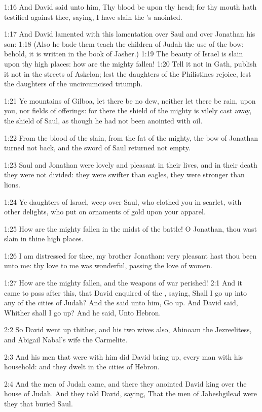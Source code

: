 1:16 And David said unto him, Thy blood be upon thy head; for thy
mouth hath testified against thee, saying, I have slain the \LORD's
anointed.

1:17 And David lamented with this lamentation over Saul and over
Jonathan his son: 1:18 (Also he bade them teach the children of Judah
the use of the bow: behold, it is written in the book of Jasher.)
1:19 The beauty of Israel is slain upon thy high places: how are the
mighty fallen!  1:20 Tell it not in Gath, publish it not in the
streets of Askelon; lest the daughters of the Philistines rejoice,
lest the daughters of the uncircumcised triumph.

1:21 Ye mountains of Gilboa, let there be no dew, neither let there be
rain, upon you, nor fields of offerings: for there the shield of the
mighty is vilely cast away, the shield of Saul, as though he had not
been anointed with oil.

1:22 From the blood of the slain, from the fat of the mighty, the bow
of Jonathan turned not back, and the sword of Saul returned not empty.

1:23 Saul and Jonathan were lovely and pleasant in their lives, and in
their death they were not divided: they were swifter than eagles, they
were stronger than lions.

1:24 Ye daughters of Israel, weep over Saul, who clothed you in
scarlet, with other delights, who put on ornaments of gold upon your
apparel.

1:25 How are the mighty fallen in the midst of the battle! O Jonathan,
thou wast slain in thine high places.

1:26 I am distressed for thee, my brother Jonathan: very pleasant hast
thou been unto me: thy love to me was wonderful, passing the love of
women.

1:27 How are the mighty fallen, and the weapons of war perished!  2:1
And it came to pass after this, that David enquired of the \LORD,
saying, Shall I go up into any of the cities of Judah? And the \LORD
said unto him, Go up. And David said, Whither shall I go up? And he
said, Unto Hebron.

2:2 So David went up thither, and his two wives also, Ahinoam the
Jezreelitess, and Abigail Nabal's wife the Carmelite.

2:3 And his men that were with him did David bring up, every man with
his household: and they dwelt in the cities of Hebron.

2:4 And the men of Judah came, and there they anointed David king over
the house of Judah. And they told David, saying, That the men of
Jabeshgilead were they that buried Saul.

